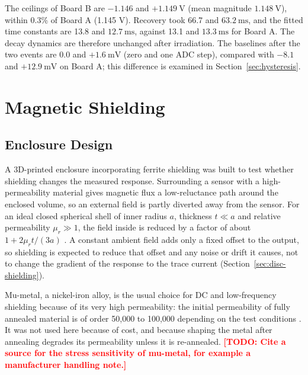 \documentclass[12pt,a4paper]{article}
\newcommand{\todo}[1]{\textcolor{red}{\textbf{[TODO: #1]}}}
\begin{document}
The ceilings of Board B are $-1.146$ and $+\SI{1.149}{\volt}$ (mean magnitude $\SI{1.148}{\volt}$), within 0.3\% of Board A (1.145 V). Recovery took 66.7 and $\SI{63.2}{\milli\second}$, and the fitted time constants are 13.8 and $\SI{12.7}{\milli\second}$, against 13.1 and $\SI{13.3}{\milli\second}$ for Board A. The decay dynamics are therefore unchanged after irradiation. The baselines after the two events are $0.0$ and $+\SI{1.6}{\milli\volt}$ (zero and one ADC step), compared with $-8.1$ and $+\SI{12.9}{\milli\volt}$ on Board A; this difference is examined in Section~\ref{sec:hysteresis}.



\section{Magnetic Shielding}
\label{sec:shielding}

\subsection{Enclosure Design}
\label{sec:shielding-enclosure}

A 3D-printed enclosure incorporating ferrite shielding was built to test whether shielding changes the measured response. Surrounding a sensor with a high-permeability material gives magnetic flux a low-reluctance path around the enclosed volume, so an external field is partly diverted away from the sensor. For an ideal closed spherical shell of inner radius $a$, thickness $t \ll a$ and relative permeability $\mu_r \gg 1$, the field inside is reduced by a factor of about $1 + 2\mu_r t/(3a)$ \cite{jackson}. A constant ambient field adds only a fixed offset to the output, so shielding is expected to reduce that offset and any noise or drift it causes, not to change the gradient of the response to the trace current (Section~\ref{sec:disc-shielding}).

Mu-metal, a nickel-iron alloy, is the usual choice for DC and low-frequency shielding because of its very high permeability: the initial permeability of fully annealed material is of order 50{,}000 to 100{,}000 depending on the test conditions \cite{msc_mumetal}. It was not used here because of cost, and because shaping the metal after annealing degrades its permeability unless it is re-annealed. \todo{Cite a source for the stress sensitivity of mu-metal, for example a manufacturer handling note.}
\end{document}
